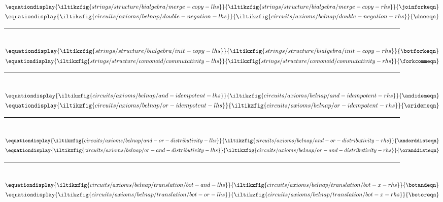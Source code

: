 \begin{figure*}
{    }{
        \orforkeqn
    }\)
    \quad
    \(\equationdisplay{
        \iltikzfig{strings/structure/bialgebra/merge-copy-lhs}
    }{
        \iltikzfig{strings/structure/bialgebra/merge-copy-rhs}
    }{
        \joinforkeqn
    }\)
    \quad
    \(\equationdisplay{
        \iltikzfig{circuits/axioms/belnap/double-negation-lhs}
    }{
        \iltikzfig{circuits/axioms/belnap/double-negation-rhs}
    }{
        \dneeqn
    }\)
    \\[0.25em]
    \rule{\textwidth}{0.1mm}
    \\[0.5em]
    \(\equationdisplay{
        \iltikzfig{strings/structure/bialgebra/init-copy-lhs}
    }{
        \iltikzfig{strings/structure/bialgebra/init-copy-rhs}
    }{
        \botforkeqn
    }\)
    \quad
    \(\equationdisplay{
        \iltikzfig{strings/structure/comonoid/commutativity-lhs}
    }{
        \iltikzfig{strings/structure/comonoid/commutativity-rhs}
    }{
        \forkcommeqn
    }\)
    \\[0.25em]
    \rule{\textwidth}{0.1mm}
    \\[0.5em]
    \(\equationdisplay{
        \iltikzfig{circuits/axioms/belnap/and-idempotent-lhs}
    }{
        \iltikzfig{circuits/axioms/belnap/and-idempotent-rhs}
    }{
        \andidemeqn
    }\)
    \quad
    \(\equationdisplay{
        \iltikzfig{circuits/axioms/belnap/or-idempotent-lhs}
    }{
        \iltikzfig{circuits/axioms/belnap/or-idempotent-rhs}
    }{
        \oridemeqn
    }\)
    \\[0.25em]
    \rule{\textwidth}{0.1mm}
    \\[0.5em]
    \(\equationdisplay{
        \iltikzfig{circuits/axioms/belnap/and-or-distributivity-lhs}
    }{
        \iltikzfig{circuits/axioms/belnap/and-or-distributivity-rhs}
    }{
        \andorddisteqn
    }\)
    \quad
    \(\equationdisplay{
        \iltikzfig{circuits/axioms/belnap/or-and-distributivity-lhs}
    }{
        \iltikzfig{circuits/axioms/belnap/or-and-distributivity-rhs}
    }{
        \oranddisteqn
    }\)
    \\[0.25em]
    \rule{\textwidth}{0.1mm}
    \\[0.5em]
    \(\equationdisplay{
        \iltikzfig{circuits/axioms/belnap/translation/bot-and-lhs}
    }{
        \iltikzfig{circuits/axioms/belnap/translation/bot-x-rhs}
    }{
        \botandeqn
    }\)
    \quad
    \(\equationdisplay{
        \iltikzfig{circuits/axioms/belnap/translation/bot-or-lhs}
    }{
        \iltikzfig{circuits/axioms/belnap/translation/bot-x-rhs}
    }{
        \botoreqn
    }\)
    \quad

\end{figure*}
